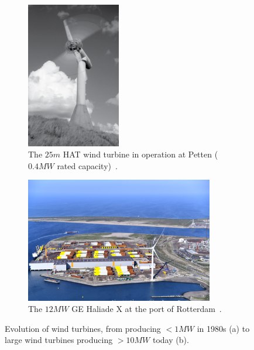 \begin{figure}[h!]
    \centering
    \captionsetup{justification=centering}
 \begin{subfigure}[b]{0.45\textwidth}
 \centering
    \captionsetup{justification=centering}
        \includegraphics[trim=0 0 0 0,clip,width=0.45\textwidth]{ch1_introduction/images/petten_25mhawt.png}
        \caption{The $25 m$ HAT wind turbine in operation at Petten ($0.4 MW$ rated capacity)~\cite{beurskens2014history}.}
    \end{subfigure}
    \begin{subfigure}[b]{0.45\textwidth}
    \centering
    \captionsetup{justification=centering}
        \includegraphics[width=0.9\textwidth]{ch1_introduction/images/gehaliadex.jpg}
        \caption{The $12 MW$ GE Haliade X at the port of Rotterdam~\cite{GE}.}
    \end{subfigure}
    \caption{Evolution of wind turbines, from producing $<1 MW$ in 1980s (a) to large wind turbines producing $>10 MW$ today (b).}
    \label{fig:windturbex2}
\end{figure}

